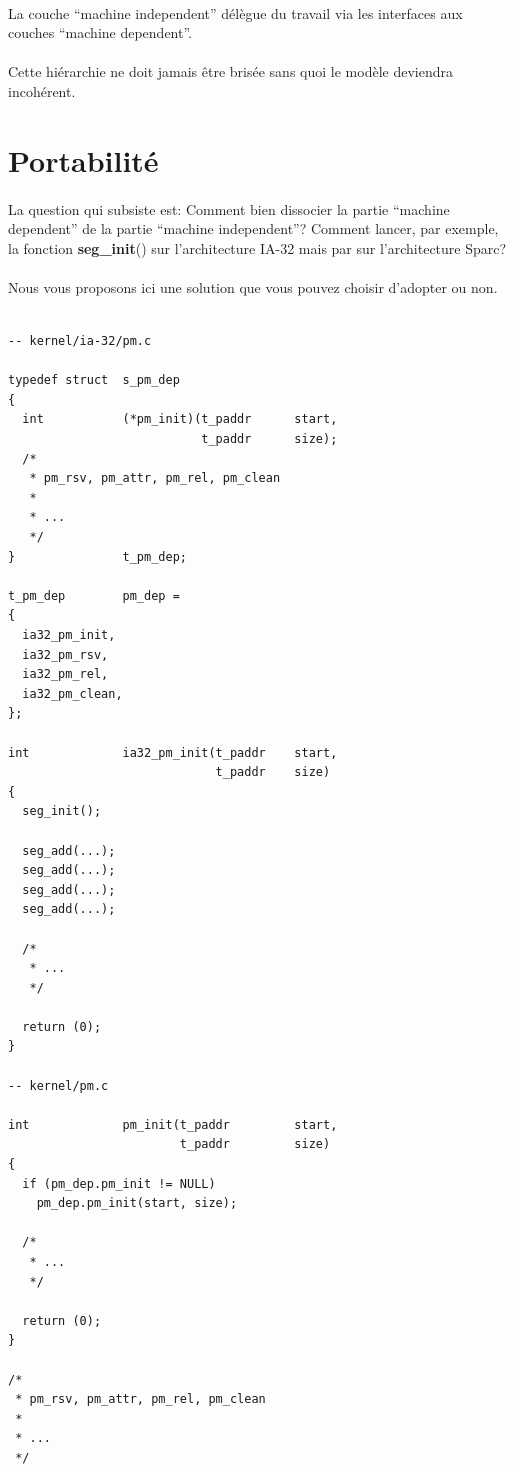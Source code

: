 \documentclass[10pt,a4wide]{article}
\begin{document}
\paragraph{}

La couche ``machine independent'' d\'el\`egue du travail via les interfaces
aux couches ``machine dependent''.

\paragraph{}

Cette hi\'erarchie ne doit jamais \^etre bris\'ee sans quoi le mod\`ele
deviendra incoh\'erent.

\section{Portabilit\'e}

\paragraph{}

La question qui subsiste est: Comment bien dissocier la partie ``machine
dependent'' de la partie ``machine independent''? Comment lancer, par
exemple, la fonction \textbf{seg\_init}() sur l'architecture IA-32 mais par sur
l'architecture Sparc?

\paragraph{}

Nous vous proposons ici une solution que vous pouvez choisir d'adopter ou non.

\begin{verbatim}

-- kernel/ia-32/pm.c

typedef struct  s_pm_dep
{
  int           (*pm_init)(t_paddr      start,
                           t_paddr      size);
  /*
   * pm_rsv, pm_attr, pm_rel, pm_clean
   *
   * ...
   */
}               t_pm_dep;

t_pm_dep        pm_dep =
{
  ia32_pm_init,
  ia32_pm_rsv,
  ia32_pm_rel,
  ia32_pm_clean,
};

int             ia32_pm_init(t_paddr    start,
                             t_paddr    size)
{
  seg_init();

  seg_add(...);
  seg_add(...);
  seg_add(...);
  seg_add(...);

  /*
   * ...
   */

  return (0);
}

-- kernel/pm.c

int             pm_init(t_paddr         start,
                        t_paddr         size)
{
  if (pm_dep.pm_init != NULL)
    pm_dep.pm_init(start, size);

  /*
   * ...
   */

  return (0);
}

/*
 * pm_rsv, pm_attr, pm_rel, pm_clean
 *
 * ...
 */
\end{verbatim}
\end{document}
